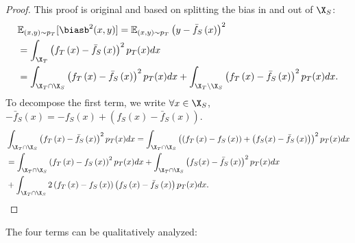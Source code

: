 \begin{proof}
    This proof is original and based on splitting the \ood bias in and out of $\X_S$:
    \begin{align*}
        &\mathbb{E}_{(x,y)\sim p_T}[\biasb^2(x, y)] = \mathbb{E}_{(x,y)\sim p_T} \left(y -\bar{f}_{S}\left(x\right)\right)^{2}                          \\
                                         & = \int_{\X_T} \left(f_T\left(x\right)-\bar{f}_{S}\left(x\right)\right)^{2} p_T(x) dx                \\
                                         & =\int_{\X_T \cap \X_S} \left(f_T\left(x\right)-\bar{f}_{S}\left(x\right)\right)^{2} p_T(x) dx +\int_{\X_T \setminus \X_S} \left(f_T\left(x\right)-\bar{f}_{S}\left(x\right)\right)^{2} p_T(x) dx.
    \end{align*}
    To decompose the first term, we write $\forall x \in \X_S$, $ - \bar{f}_{S}\left(x\right) = - f_S\left(x\right) + \left(f_{S}(x) - \bar{f}_{S}\left(x\right)\right)$.
    \begin{align*}
        &\int_{\X_T \cap \X_S} \left(f_T\left(x\right)-\bar{f}_{S}\left(x\right)\right)^{2} p_T(x) dx=\int_{\X_T \cap \X_S} \left((f_T\left(x\right) - f_S\left(x\right)) + \left(f_{S}(x) - \bar{f}_{S}\left(x\right)\right) \right)^{2} p_T(x) dx \\
        & =\int_{\X_T \cap \X_S} \left(f_T\left(x\right) - f_S\left(x\right)\right)^{2} p_T(x)dx + \int_{\X_T \cap \X_S} \left(f_{S}(x) - \bar{f}_{S}\left(x\right)\right)^{2} p_T(x)dx \\
        & + \int_{\X_T \cap \X_S} 2 \left(f_T\left(x\right) - f_S\left(x\right)\right) \left(f_S\left(x\right) - \bar{f}_{S}\left(x\right)\right) p_T(x)dx.
    \end{align*}%
\end{proof}
The four terms can be qualitatively analyzed:
